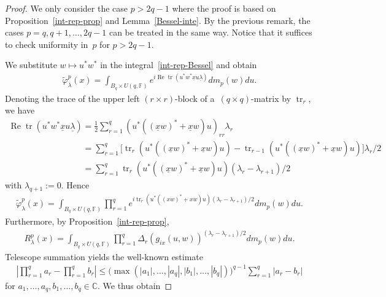 \documentclass[pdftex]{sigma}
\numberwithin{equation}{section}
\DeclareMathOperator{\Ree}{Re}
\begin{document}
\begin{proof}
We only consider the case $p>2q-1$ where the proof is based on Proposition~\ref{int-rep-prop} and
Lemma~\ref{Bessel-inte}.
By the previous remark, the cases $p={q,q+1,\ldots,2q-1}$ can be treated in the same way.
Notice that it suf\/f\/ices to check uniformity in~$p$ for $p>2q-1$.

We substitute $w\mapsto u^*w^*$ in the integral~\eqref{int-rep-Bessel} and obtain
\begin{gather*}
\widetilde\varphi_\lambda^{p}(x)= \int_{B_q\times U(q, \mathbb F)} e^{i \Ree \operatorname{tr}(u^* w^*\underline x u\underline \lambda )}dm_p(w)du.
\end{gather*}
Denoting the trace of the upper left $(r\times r)$-block of a~$(q\times q)$-matrix by $\operatorname{tr}_r$, we have
\begin{gather*}
\Ree \operatorname{tr}(u^* w^*\underline x u\underline\lambda)
=\frac{1}{2} \sum\limits_{r=1}^q (u^*((\underline x w)^*+\underline x w)u)_{rr}  \lambda_r
\\
\phantom{\Ree \operatorname{tr}(u^* w^*\underline x u\underline\lambda)}{}
=\sum\limits_{r=1}^q \bigl[ \operatorname{tr}_r(u^*((\underline xw)^*+\underline xw)u) - \operatorname{tr}_{r-1}(u^*((\underline xw)^*+\underline xw)u)\bigr]   \lambda_r/2
\\
\phantom{\Ree \operatorname{tr}(u^* w^*\underline x u\underline\lambda)}{}
=\sum\limits_{r=1}^q \operatorname{tr}_r(u^*((\underline xw)^*+ \underline xw)u)  (\lambda_r-\lambda_{r+1})/2
\end{gather*}
with $\lambda_{q+1}:=0$.
Hence
\begin{gather*}
\widetilde\varphi_\lambda^{p}(x)
=\int_{B_q\times U(q,\mathbb F)} \prod\limits_{r=1}^q e^{i  \operatorname{tr}_r(u^*((xw)^*+xw)u) (\lambda_r-\lambda_{r+1})/2} dm_p(w)du.
\end{gather*}
Furthermore, by Proposition~\ref{int-rep-prop},
\begin{gather*}
R_{\lambda}^p(x)=\int_{B_q\times U(q,\mathbb F)} \prod\limits_{r=1}^q\Delta_r(g_{ix}(u,w))^{(\lambda_r-\lambda_{r+1})/2} dm_p(w)du.
\end{gather*}
Telescope summation yields the well-known estimate
\begin{gather*}
\left|\prod\limits_{r=1}^q a_r
-\prod\limits_{r=1}^q b_r\right|\le\big(\max(|a_1|,\ldots,|a_q|,|b_1|,\ldots, |b_q|)\big)^{q-1}  \sum\limits_{r=1}^q|a_r-b_r|
\end{gather*}
for $a_1,\ldots,a_q,b_1,\ldots,b_q\in \mathbb C$.
We thus obtain

\end{proof}
\end{document}
